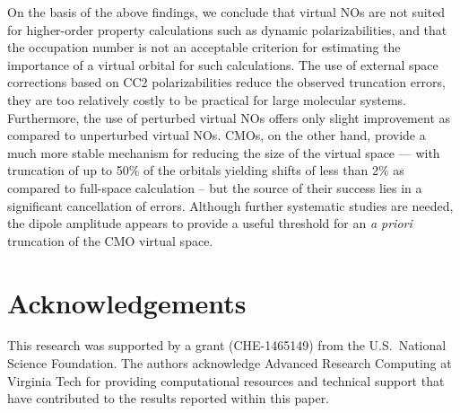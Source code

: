 \documentclass[11pt,article]{achemso}
\begin{document}
On the basis of the above findings, we conclude that virtual NOs are not
suited for higher-order property calculations such as dynamic
polarizabilities, and that the occupation number is not an acceptable
criterion for estimating the importance of a virtual orbital for such
calculations.  The use of external space corrections based on CC2
polarizabilities reduce the observed truncation errors, they are too
relatively costly to be practical for large molecular systems.  Furthermore,
the use of perturbed virtual NOs offers only slight improvement as compared to
unperturbed virtual NOs.  CMOs, on the other hand, provide a much more stable
mechanism for reducing the size of the virtual space --- with truncation of up
to 50\% of the orbitals yielding shifts of less than 2\% as compared to
full-space calculation -- but the source of their success lies in a
significant cancellation of errors.  Although further systematic studies are
needed, the dipole amplitude appears to provide a useful threshold for an {\em
a priori} truncation of the CMO virtual space.

\section{Acknowledgements}

This research was supported by a grant (CHE-1465149) from the U.S.\
National Science Foundation. The authors acknowledge Advanced Research
Computing at Virginia Tech for providing computational resources and
technical support that have contributed to the results reported within this
paper.
\end{document}
